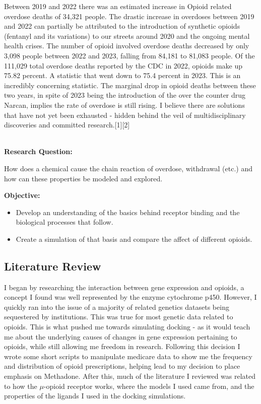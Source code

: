 \documentclass[a4paper,10pt]{article}
\begin{document}
Between 2019 and 2022 there was an estimated increase in Opioid related overdose deaths of 34,321 people. The drastic increase in overdoses between 2019 and 2022 can partially be attributed to the introduction of synthetic opioids (fentanyl and its variations) to our streets around 2020 and the ongoing mental health crises. The number of opioid involved overdose deaths decreased by only 3,098 people between 2022 and 2023, falling from 84,181 to 81,083 people. Of the 111,029 total overdose deaths reported by the CDC in 2022, opioids make up 75.82 percent. A statistic that went down to 75.4 percent in 2023. This is an incredibly concerning statistic. The marginal drop in opioid deaths between these two years, in spite of 2023 being the introduction of the over the counter drug Narcan, implies the rate of overdose is still rising. 
 I believe there are solutions that have not yet been exhausted - hidden behind the veil of multidisciplinary discoveries and committed research.[1][2]\\
\\

\begin{raggedleft}\textbf{Research Question:}
\end{raggedleft}
How does a chemical cause the chain reaction of overdose, withdrawal (etc.) and how can these properties be modeled and explored.

\textbf{Objective:}
\begin{itemize}
    \item Develop an understanding of the basics behind receptor binding and the biological processes that follow.
    \item  Create a simulation of that basis and compare the affect of different opioids.
\end{itemize}

\subsection{Literature Review}
\small
I began by researching the interaction between gene expression and opioids, a concept I found was well represented by the enzyme cytochrome p450. 
However, I quickly ran into the issue of a majority of related genetics datasets being sequestered by institutions. This was true for most genetic data related to opioids. This is what pushed me towards simulating docking - as it would teach me about the underlying causes of changes in gene expression pertaining to opioids, while still allowing me freedom in research. Following this decision I wrote some short scripts to manipulate medicare data to show me the frequency and distribution of opioid prescriptions, helping lead to my decision to place emphasis on Methadone. After this, much of the literature I reviewed was related to how the $\mu$-opioid receptor works, where the models I used came from, and the properties of the ligands I used in the docking simulations.
\end{document}
